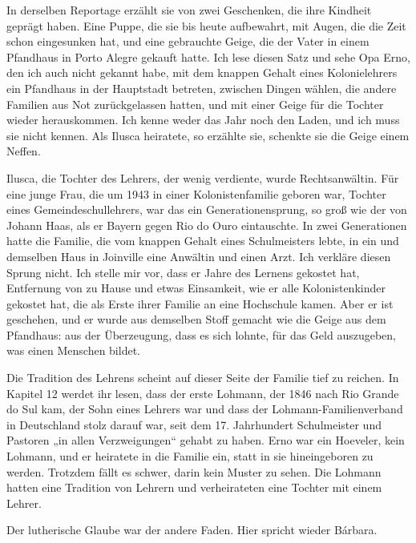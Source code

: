 \documentclass[
  ngerman,
  11pt,
  openany]{book}
\begin{document}
In derselben Reportage erzählt sie von zwei Geschenken, die ihre
Kindheit geprägt haben. Eine Puppe, die sie bis heute aufbewahrt, mit
Augen, die die Zeit schon eingesunken hat, und eine gebrauchte Geige,
die der Vater in einem Pfandhaus in Porto Alegre gekauft hatte. Ich lese
diesen Satz und sehe Opa Erno, den ich auch nicht gekannt habe, mit dem
knappen Gehalt eines Kolonielehrers ein Pfandhaus in der Hauptstadt
betreten, zwischen Dingen wählen, die andere Familien aus Not
zurückgelassen hatten, und mit einer Geige für die Tochter wieder
herauskommen. Ich kenne weder das Jahr noch den Laden, und ich muss sie
nicht kennen. Als Ilusca heiratete, so erzählte sie, schenkte sie die
Geige einem Neffen.

Ilusca, die Tochter des Lehrers, der wenig verdiente, wurde
Rechtsanwältin. Für eine junge Frau, die um 1943 in einer
Kolonistenfamilie geboren war, Tochter eines Gemeindeschullehrers, war
das ein Generationensprung, so groß wie der von Johann Haas, als er
Bayern gegen Rio do Ouro eintauschte. In zwei Generationen hatte die
Familie, die vom knappen Gehalt eines Schulmeisters lebte, in ein und
demselben Haus in Joinville eine Anwältin und einen Arzt. Ich verkläre
diesen Sprung nicht. Ich stelle mir vor, dass er Jahre des Lernens
gekostet hat, Entfernung von zu Hause und etwas Einsamkeit, wie er alle
Kolonistenkinder gekostet hat, die als Erste ihrer Familie an eine
Hochschule kamen. Aber er ist geschehen, und er wurde aus demselben
Stoff gemacht wie die Geige aus dem Pfandhaus: aus der Überzeugung, dass
es sich lohnte, für das Geld auszugeben, was einen Menschen bildet.

Die Tradition des Lehrens scheint auf dieser Seite der Familie tief zu
reichen. In Kapitel 12 werdet ihr lesen, dass der erste Lohmann, der
1846 nach Rio Grande do Sul kam, der Sohn eines Lehrers war und dass der
Lohmann-Familienverband in Deutschland stolz darauf war, seit dem 17.
Jahrhundert Schulmeister und Pastoren „in allen Verzweigungen`` gehabt
zu haben. Erno war ein Hoeveler, kein Lohmann, und er heiratete in die
Familie ein, statt in sie hineingeboren zu werden. Trotzdem fällt es
schwer, darin kein Muster zu sehen. Die Lohmann hatten eine Tradition
von Lehrern und verheirateten eine Tochter mit einem Lehrer.

Der lutherische Glaube war der andere Faden. Hier spricht wieder
Bárbara.
\end{document}

